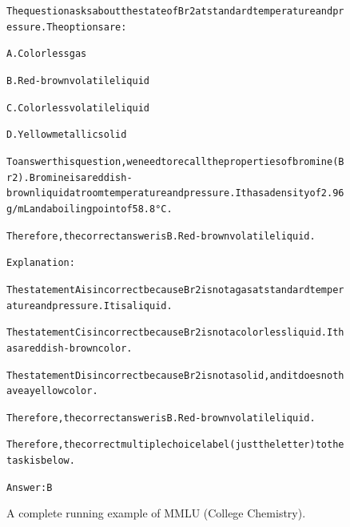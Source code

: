 \begin{figure}[t]
{{\begin{alltt}
The question asks about the state of Br2 at standard temperature and pressure. The options are:

A. Colorless gas

B. Red-brown volatile liquid

C. Colorless volatile liquid

D. Yellow metallic solid

To answer this question, we need to recall the properties of bromine (Br2). Bromine is a reddish-brown liquid at room temperature and pressure. It has a density of 2.96 g/mL and a boiling point of 58.8°C.

Therefore, the correct answer is B. Red-brown volatile liquid.

Explanation:

The statement A is incorrect because Br2 is not a gas at standard temperature and pressure. It is a liquid.

The statement C is incorrect because Br2 is not a colorless liquid. It has a reddish-brown color.

The statement D is incorrect because Br2 is not a solid, and it does not have a yellow color.

Therefore, the correct answer is B. Red-brown volatile liquid.

Therefore, the correct multiple choice label (just the letter) to the task is below.

Answer: B
\end{alltt}
}}
\caption{A complete running example of MMLU (College Chemistry).}
\label{fig:mmlu_subject=college_chemistry_example}
\end{figure}
